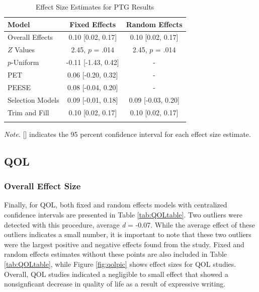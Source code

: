 \documentclass[english,man]{apa6}
\theoremstyle{definition}
\theoremstyle{definition}
\theoremstyle{definition}
\theoremstyle{remark}
\begin{document}
\begin{table}[tbp]
\begin{center}
\begin{threeparttable}
\caption{\label{tab:PTGtable}Effect Size Estimates for PTG Results}
\small{
\begin{tabular}{lcc}
\toprule
Model & Fixed Effects & Random Effects\\
\midrule
Overall Effects & 0.10 [0.02, 0.17] & 0.10 [0.02, 0.17]\\
$Z$ Values & 2.45, $p$ = .014 & 2.45, $p$ = .014\\
$p$-Uniform & -0.11 [-1.43, 0.42] & -\\
PET & 0.06 [-0.20, 0.32] & -\\
PEESE & 0.08 [-0.04, 0.20] & -\\
Selection Models & 0.09 [-0.01, 0.18] & 0.09 [-0.03, 0.20]\\
Trim and Fill & 0.10 [0.02, 0.17] & 0.10 [0.02, 0.17]\\
\bottomrule
\addlinespace
\end{tabular}
}
\begin{tablenotes}[para]
\textit{Note.} [] indicates the 95 percent confidence interval for each effect size estimate.
\end{tablenotes}
\end{threeparttable}
\end{center}
\end{table}

\subsection{QOL}\label{qol}

\subsubsection{Overall Effect Size}\label{overall-effect-size-2}

Finally, for QOL, both fixed and random effects models with centralized
confidence intervals are presented in Table \ref{tab:QOLtable}. Two
outliers were detected with this procedure, average \emph{d} = -0.07.
While the average effect of these outliers indicates a small number, it
is important to note that these two outliers were the largest positive
and negative effects found from the \textcite{Possemato2010} study.
Fixed and random effects estimates without these points are also
included in Table \ref{tab:QOLtable}, while Figure \ref{fig:qolpic}
shows effect sizes for QOL studies. Overall, QOL studies indicated a
negligible to small effect that showed a nonsignficant decrease in
quality of life as a result of expressive writing.
\end{document}
